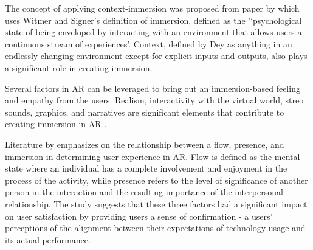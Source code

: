 The concept of applying context-immersion was proposed from paper by \cite{KIM201379} which uses Witmer and Signer's definition of immersion, defined as the '‘psychological state of being enveloped by interacting with an environment that allows users a continuous stream of experiences’. Context, defined by Dey as anything in an endlessly changing environment except for explicit inputs and outputs, also plays a significant role in creating immersion. 

Several factors in AR can be leveraged to bring out an immersion-based feeling and empathy from the users. Realism, interactivity with the virtual world, streo sounds, graphics, and narratives are significant elements that contribute to creating immersion in AR \cite{marto2022}.

Literature by \cite{immersionAR} emphasizes on the relationship between a flow, presence, and immersion in determining user experience in AR. Flow is defined as the mental state where an individual has a complete involvement and enjoyment in the process of the activity, while presence refers to the level of significance of another person in the interaction and the resulting importance of the interpersonal relationship. The study suggests that these three factors had a significant impact on user satisfaction by providing users a sense of confirmation - a users' perceptions of the alignment between their expectations of technology usage and its actual performance.















